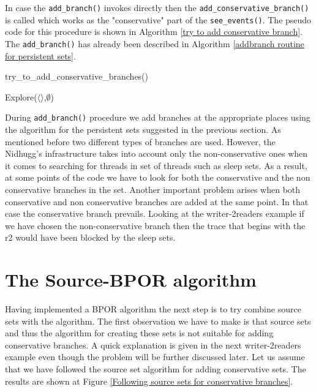 In case the \verb|add_branch()| invokes directly then the \verb|add_conservative_branch()| is called which works as the "conservative"
part of the \verb|see_events()|. The pseudo code for this procedure is shown in Algorithm \ref{try to add conservative branch}.
The \verb|add_branch()| has already been described in Algorithm \ref{addbranch routine for persistent sets}.

\begin{algorithm}[H]
    \caption{try\_to\_add\_conservative\_branches()}
    \label{seeevents routine for BPOR}
    Explore($\langle \rangle$,$\emptyset$)\;
\end{algorithm}

During \verb|add_branch()| procedure we add branches at the appropriate places using the algorithm for the persistent sets suggested in the previous section.
As mentioned before two different types of branches are used. However, the Nidhugg's infrastructure takes into account only the non-conservative ones when it comes
to searching for threads in set of threads such as sleep sets. As a result, at some points of the code we have to look for both the conservative and the non conservative
branches in the set. 
Another important problem arises when both conservative and non conservative branches are added at the same point. In that case the conservative branch prevails.
Looking at the writer-2readers example if we have chosen the non-conservative branch then the trace that begins with the r2 would have been blocked by the sleep sets.

\section{The Source-BPOR algorithm}
Having implemented a BPOR algorithm the next step is to try combine source sets with the algorithm. The first observation we have to make is that
source sets and thus the algorithm for creating these sets is not suitable for adding conservative branches. A quick explanation is given in the next writer-2readers example
even though the problem will be further discussed later. Let us assume that we have followed the source set algorithm for adding conservative sets. 
The results are shown at Figure \ref{Following source sets for conservative branches}.


